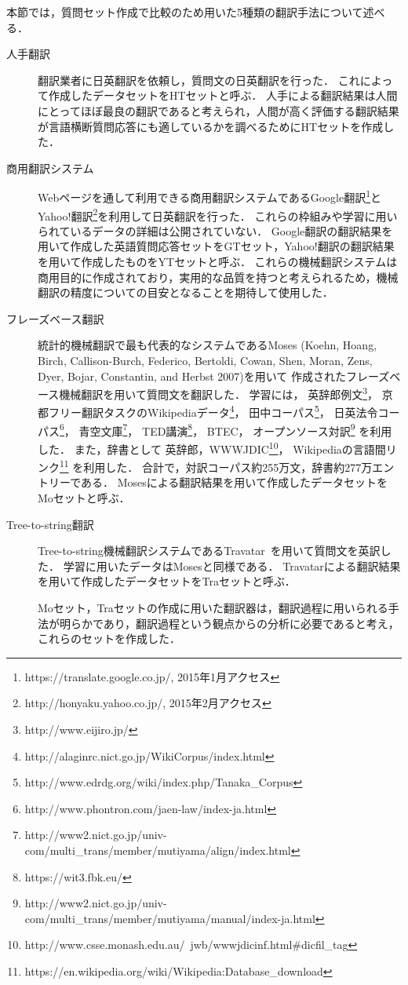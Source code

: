 \documentclass[japanese]{jnlp_1.4}
\begin{document}
本節では，質問セット作成で比較のため用いた5種類の翻訳手法について述べる．

\begin{description}
\item[{人手翻訳}]
翻訳業者に日英翻訳を依頼し，質問文の日英翻訳を行った．
これによって作成したデータセットをHTセットと呼ぶ．
人手による翻訳結果は人間にとってほぼ最良の翻訳であると考えられ，人間が高く評価する翻訳結果が言語横断質問応答にも適しているかを調べるためにHTセットを作成した．

\item[商用翻訳システム]
Webページを通して利用できる商用翻訳システムであるGoogle翻訳\footnote{https://translate.google.co.jp/, 2015年1月アクセス}とYahoo!翻訳\footnote{http://honyaku.yahoo.co.jp/, 2015年2月アクセス}を利用して日英翻訳を行った．
これらの枠組みや学習に用いられているデータの詳細は公開されていない．
Google翻訳の翻訳結果を用いて作成した英語質問応答セットをGTセット，Yahoo!翻訳の翻訳結果を用いて作成したものをYTセットと呼ぶ．
これらの機械翻訳システムは商用目的に作成されており，実用的な品質を持つと考えられるため，機械翻訳の精度についての目安となることを期待して使用した．

\item[フレーズベース翻訳]
    統計的機械翻訳で最も代表的なシステムであるMoses (Koehn, Hoang, Birch, Callison-Burch, Federico, Bertoldi, Cowan, Shen, Moran, Zens, Dyer, Bojar, \linebreak Constantin, and Herbst 2007)\nocite{moses}を用いて
作成されたフレーズベース機械翻訳を用いて質問文を翻訳した．
学習には，
英辞郎例文\footnote{http://www.eijiro.jp/}，
京都フリー翻訳タスクのWikipediaデータ\footnote{http://alaginrc.nict.go.jp/WikiCorpus/index.html}，
田中コーパス\footnote{http://www.edrdg.org/wiki/index.php/Tanaka\_Corpus}，
日英法令コーパス\footnote{http://www.phontron.com/jaen-law/index-ja.html}，
青空文庫\footnote{http://www2.nict.go.jp/univ-com/multi\_trans/member/mutiyama/align/index.html}，
TED講演\footnote{https://wit3.fbk.eu/}，
BTEC，
オープンソース対訳\footnote{http://www2.nict.go.jp/univ-com/multi\_trans/member/mutiyama/manual/index-ja.html}
を利用した．
また，辞書として
英辞郎，WWWJDIC\footnote{http://www.csse.monash.edu.au/~jwb/wwwjdicinf.html\#dicfil\_tag}，
Wikipediaの言語間リンク\footnote{https://en.wikipedia.org/wiki/Wikipedia:Database\_download}
を利用した．
合計で，対訳コーパス約255万文，辞書約277万エントリーである．
Mosesによる翻訳結果を用いて作成したデータセットをMoセットと呼ぶ．

\item[Tree-to-string翻訳]
Tree-to-string機械翻訳システムであるTravatar~\cite{travatar}を用いて質問文を英訳した．
学習に用いたデータはMosesと同様である．
Travatarによる翻訳結果を用いて作成したデータセットをTraセットと呼ぶ．

Moセット，Traセットの作成に用いた翻訳器は，翻訳過程に用いられる手法が明らかであり，翻訳過程という観点からの分析に必要であると考え，これらのセットを作成した．

\end{description}
\end{document}
